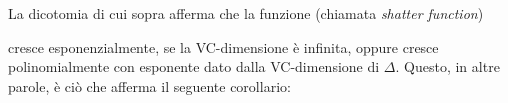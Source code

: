 La dicotomia di cui sopra afferma che la funzione (chiamata \textit{shatter function\/})


cresce esponenzialmente, se la VC-dimensione \`e infinita, oppure cresce polinomialmente con esponente dato dalla VC-dimensione di $\Delta$. Questo, in altre parole, \`e ci\`o che afferma il seguente corollario:

\begin{comment}%
\begin{corollary}
Se la VC-dimensione di $\Delta$ \`e $k$, allora per ogni $n\ge k$

\ceq{\hfill S(n,\Delta)}{\le}{\displaystyle\Bigg(\frac{en}{k}\Bigg)^k,}

dove $e$ \`e la base del logaritmo naturale.
\end{corollary}
\begin{proof}
La seconda affermazione \`e ovvia. Per la prima \`e sufficiente osservare che 

\ceq{\hfill \bigsum^{k}_{i=0}\binom{n}{i}}{\le}{\bigsum^{n}_{i=0}\binom{n}{i}}

\ceq{}{\le}{\bigsum^{n}_{i=0}\binom{n}{i}\Bigg(\frac{n}{k}\Bigg)^{k-i}}

\ceq{}{=}{\Bigg(\frac{n}{k}\Bigg)^k\bigsum^{n}_{i=0}\binom{n}{i}\Bigg(\frac{k}{n}\Bigg)^i}

\ceq{}{\le}{\Bigg(\frac{n}{k}\Bigg)^k\Bigg(1+\frac{k}{n}\Bigg)^{n}}

\ceq{}{\le}{\Bigg(\frac{n}{k}\Bigg)^ke^k}

Per l'ultima disuguaglianza ricordiamo che per ogni $x$ positivo $1+x\le e^x$, e quindi $\ln(1+x)\le x$.
\end{proof}

Per semplificare i dettagli la maggiorazione che useremo sar\`a come riportiamo nella seguente:

\begin{remark}
Se la dimensione \`e infinita $S(n,\Delta)=2^n$  per ogni $n$ e cos\`i anche per dimensione finita ed $n<k$. Quindi  per ogni $n$

\ceq{\hfill S(n,\Delta)}{\le}{\displaystyle\Bigg(\frac{2en}{k}\Bigg)^k.}\hfill\qed
\end{remark}
\end{comment}


\def\ceq#1#2#3#4{\parbox[t]{25ex}{$\displaystyle #1$}\parbox{7ex}{$\displaystyle\hfil #2$}{$\displaystyle #3$}\parbox{7ex}{$\displaystyle\hfil #4$}}

